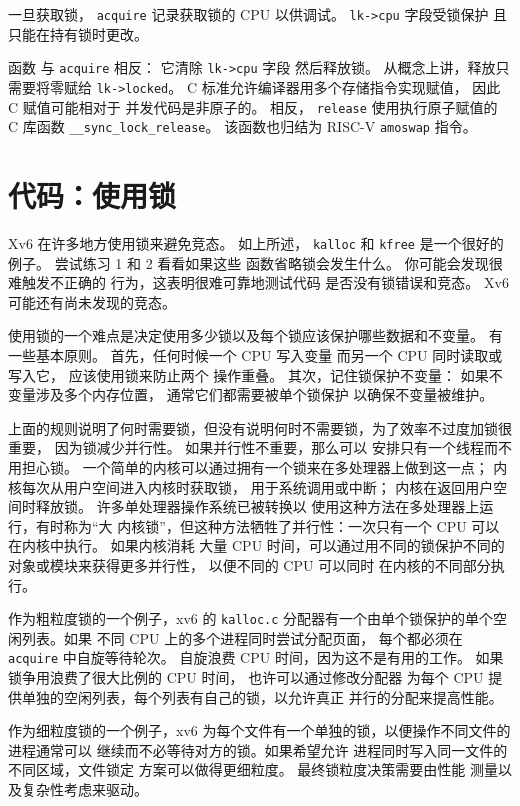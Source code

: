 一旦获取锁，
\lstinline{acquire}
记录获取锁的 CPU
以供调试。
\lstinline{lk->cpu}
字段受锁保护
且只能在持有锁时更改。

函数
与
\lstinline{acquire}
相反：
它清除
\lstinline{lk->cpu}
字段
然后释放锁。
从概念上讲，释放只需要将零赋给
\lstinline{lk->locked}。
C 标准允许编译器用多个存储指令实现赋值，
因此 C 赋值可能相对于
并发代码是非原子的。
相反，
\lstinline{release}
使用执行原子赋值的 C 库函数
\lstinline{__sync_lock_release}。
该函数也归结为 RISC-V
\lstinline{amoswap}
指令。
\section{代码：使用锁}
Xv6 在许多地方使用锁来避免竞态。
如上所述，
\lstinline{kalloc}
和
\lstinline{kfree}
是一个很好的例子。
尝试练习 1 和 2 看看如果这些
函数省略锁会发生什么。
你可能会发现很难触发不正确的
行为，这表明很难可靠地测试代码
是否没有锁错误和竞态。
Xv6 可能还有尚未发现的竞态。

使用锁的一个难点是决定使用多少锁以及每个锁应该保护哪些数据和不变量。
有一些基本原则。
首先，任何时候一个 CPU 写入变量
而另一个 CPU 同时读取或写入它，
应该使用锁来防止两个
操作重叠。
其次，记住锁保护不变量：
如果不变量涉及多个内存位置，
通常它们都需要被单个锁保护
以确保不变量被维护。

上面的规则说明了何时需要锁，但没有说明何时不需要锁，为了效率不过度加锁很重要，
因为锁减少并行性。
如果并行性不重要，那么可以
安排只有一个线程而不用担心锁。
一个简单的内核可以通过拥有一个锁来在多处理器上做到这一点；
内核每次从用户空间进入内核时获取锁，
用于系统调用或中断；
内核在返回用户空间时释放锁。
许多单处理器操作系统已被转换以
使用这种方法在多处理器上运行，有时称为``大
内核锁''，但这种方法牺牲了并行性：一次只有一个
CPU 可以在内核中执行。
如果内核消耗
大量 CPU 时间，可以通过用不同的锁保护不同的对象或模块来获得更多并行性，
以便不同的 CPU 可以同时
在内核的不同部分执行。

作为粗粒度锁的一个例子，xv6 的 \lstinline{kalloc.c}
分配器有一个由单个锁保护的单个空闲列表。如果
不同 CPU 上的多个进程同时尝试分配页面，
每个都必须在 {\tt acquire} 中自旋等待轮次。
自旋浪费 CPU 时间，因为这不是有用的工作。
如果锁争用浪费了很大比例的 CPU 时间，
也许可以通过修改分配器
为每个 CPU 提供单独的空闲列表，每个列表有自己的锁，以允许真正
并行的分配来提高性能。

作为细粒度锁的一个例子，xv6 为每个文件有一个单独的锁，以便操作不同文件的进程通常可以
继续而不必等待对方的锁。如果希望允许
进程同时写入同一文件的不同区域，文件锁定
方案可以做得更细粒度。
最终锁粒度决策需要由性能
测量以及复杂性考虑来驱动。

